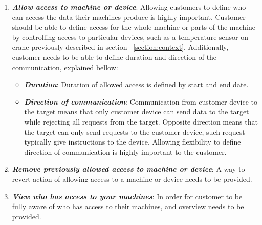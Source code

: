 \begin{enumerate}
	\setlength{\itemsep}{1pt}
	\item \textbf{\textit{Allow access to machine or device}}: Allowing customers to define who can access the data their machines produce is highly important. Customer should be able to define access for the whole machine or parts of the machine by controlling access to particular devices, such as a temperature sensor on crane previously described in section ~\ref{section:context}. Additionally, customer needs to be able to define duration and direction of the communication, explained bellow:
		\begin{itemize}
			\item \textbf{\textit{Duration}}: Duration of allowed access is defined by start and end date.
			\item \textbf{\textit{Direction of communication}}: Communication from customer device to the target means that only customer device can send data to the target while rejecting all requests from the target. Opposite direction means that the target can only send requests to the customer device, such request typically give instructions to the device. Allowing flexibility to define direction of communication is highly important to the customer.
		\end{itemize}

	\item \textbf{\textit{Remove previously allowed access to machine or device}}: A way to revert action of allowing access to a machine or device needs to be provided. 
		
	\item \textbf{\textit{View who has access to your machines}}: In order for customer to be fully aware of who has access to their machines, and overview needs to be provided.

\end{enumerate}

